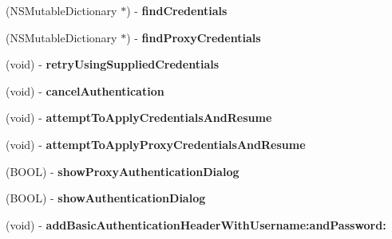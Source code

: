 \begin{DoxyCompactItemize}
\item 
\hypertarget{interface_a_s_i_h_t_t_p_request_af337cbd50189506479260c6069ca2ded}{
(NSMutableDictionary $\ast$) -\/ {\bfseries findCredentials}}
\label{interface_a_s_i_h_t_t_p_request_af337cbd50189506479260c6069ca2ded}

\item 
\hypertarget{interface_a_s_i_h_t_t_p_request_aee0699cfb5ba5749a1461dfa56440121}{
(NSMutableDictionary $\ast$) -\/ {\bfseries findProxyCredentials}}
\label{interface_a_s_i_h_t_t_p_request_aee0699cfb5ba5749a1461dfa56440121}

\item 
\hypertarget{interface_a_s_i_h_t_t_p_request_aad1efa3b1bc64006cc033bd0d4eee7cc}{
(void) -\/ {\bfseries retryUsingSuppliedCredentials}}
\label{interface_a_s_i_h_t_t_p_request_aad1efa3b1bc64006cc033bd0d4eee7cc}

\item 
\hypertarget{interface_a_s_i_h_t_t_p_request_a25d3d77f917c5f8b9956f6a45022dae2}{
(void) -\/ {\bfseries cancelAuthentication}}
\label{interface_a_s_i_h_t_t_p_request_a25d3d77f917c5f8b9956f6a45022dae2}

\item 
\hypertarget{interface_a_s_i_h_t_t_p_request_ad3da0a488faf41101bbf73a8071456e8}{
(void) -\/ {\bfseries attemptToApplyCredentialsAndResume}}
\label{interface_a_s_i_h_t_t_p_request_ad3da0a488faf41101bbf73a8071456e8}

\item 
\hypertarget{interface_a_s_i_h_t_t_p_request_a03ce363e92c2d5dbe7229f021b0230a5}{
(void) -\/ {\bfseries attemptToApplyProxyCredentialsAndResume}}
\label{interface_a_s_i_h_t_t_p_request_a03ce363e92c2d5dbe7229f021b0230a5}

\item 
\hypertarget{interface_a_s_i_h_t_t_p_request_ad9c4b7b0abc790e74806860c6d7a7a5b}{
(BOOL) -\/ {\bfseries showProxyAuthenticationDialog}}
\label{interface_a_s_i_h_t_t_p_request_ad9c4b7b0abc790e74806860c6d7a7a5b}

\item 
\hypertarget{interface_a_s_i_h_t_t_p_request_a64d812546f152b29ddd614938ffa5539}{
(BOOL) -\/ {\bfseries showAuthenticationDialog}}
\label{interface_a_s_i_h_t_t_p_request_a64d812546f152b29ddd614938ffa5539}

\item 
\hypertarget{interface_a_s_i_h_t_t_p_request_a0295b7fbbc9af2be76f9dfe06f75f1ca}{
(void) -\/ {\bfseries addBasicAuthenticationHeaderWithUsername:andPassword:}}
\label{interface_a_s_i_h_t_t_p_request_a0295b7fbbc9af2be76f9dfe06f75f1ca}


\end{DoxyCompactItemize}
